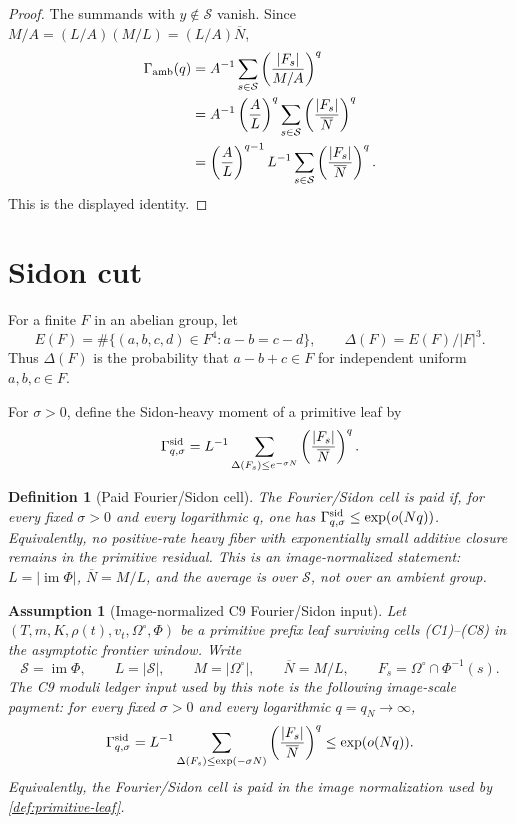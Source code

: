 \documentclass[11pt,a4paper]{amsart}
\numberwithin{equation}{section}
\newtheorem{definition}[theorem]{Definition}
\newtheorem{assumption}[theorem]{Assumption}
\theoremstyle{remark}
\newcommand{\Scal}{\mathcal S}
\newcommand{\OmegaC}{\Omega^{\circ}}
\newcommand{\Gsid}{\Gamma^{\rm sid}}
\newcommand{\barN}{\overline N}
\begin{document}
\begin{proof}
The summands with \(y\notin\Scal\) vanish.  Since \(M/A=(L/A)(M/L)=(L/A)\barN\),
\[
\begin{aligned}
        \Gamma_{\rm amb}(q)
        &=A^{-1}\sum_{s\in\Scal}
        \left(\frac{|F_s|}{M/A}\right)^q \\
        &=A^{-1}\left(\frac{A}{L}\right)^q
        \sum_{s\in\Scal}\left(\frac{|F_s|}{\barN}\right)^q \\
        &=\left(\frac{A}{L}\right)^{q-1}
        L^{-1}\sum_{s\in\Scal}\left(\frac{|F_s|}{\barN}\right)^q .
\end{aligned}
\]
This is the displayed identity.
\end{proof}

\section{Sidon cut}

For a finite \(F\) in an abelian group, let
\[
        E(F)=\#\{(a,b,c,d)\in F^4:a-b=c-d\},\qquad
        \Delta(F)=E(F)/|F|^3.
\]
Thus \(\Delta(F)\) is the probability that \(a-b+c\in F\) for independent uniform \(a,b,c\in F\).

For \(\sigma>0\), define the Sidon-heavy moment of a primitive leaf by
\[
        \Gsid_{q,\sigma}
        =L^{-1}\sum_{\Delta(F_s)\le e^{-\sigma N}}
        \left(\frac{|F_s|}{\barN}\right)^q .
\]

\begin{definition}[Paid Fourier/Sidon cell]\label{def:sidon-paid}
The Fourier/Sidon cell is paid if, for every fixed \(\sigma>0\) and every logarithmic \(q\), one has \(\Gsid_{q,\sigma}\le\exp(o(Nq))\).  Equivalently, no positive-rate heavy fiber with exponentially small additive closure remains in the primitive residual.  This is an image-normalized statement: \(L=|\operatorname{im}\Phi|\), \(\barN=M/L\), and the average is over \(\Scal\), not over an ambient group.
\end{definition}

\begin{assumption}[Image-normalized C9 Fourier/Sidon input]\label{ass:image-normalized-sidon-input}
Let \((T,m,K,\rho(t),v_t,\OmegaC,\Phi)\) be a primitive prefix leaf surviving cells \textup{(C1)--(C8)} in the asymptotic frontier window.  Write
\[
        \Scal=\operatorname{im}\Phi,\qquad
        L=|\Scal|,\qquad
        M=|\OmegaC|,\qquad
        \barN=M/L,\qquad
        F_s=\OmegaC\cap\Phi^{-1}(s).
\]
The C9 moduli ledger input used by this note is the following image-scale payment: for every fixed \(\sigma>0\) and every logarithmic \(q=q_N\to\infty\),
\[
        \Gsid_{q,\sigma}
        =L^{-1}\sum_{\Delta(F_s)\le \exp(-\sigma N)}
        \left(\frac{|F_s|}{\barN}\right)^q
        \le \exp(o(Nq)).
\]
Equivalently, the Fourier/Sidon cell is paid in the image normalization used by \cref{def:primitive-leaf}.
\end{assumption}
\end{document}
